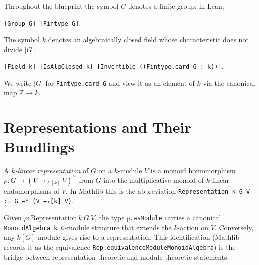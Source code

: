 \begin{definition}
  \label{def:standing-hypotheses}
  \mathlibok
  Throughout the blueprint the symbol $G$ denotes a finite group: in Lean,
  \begin{center}
    \texttt{[Group G] [Fintype G]}.
  \end{center}
  The symbol $k$ denotes an algebraically closed field whose characteristic does
  not divide $|G|$:
  \begin{center}
    \texttt{[Field k] [IsAlgClosed k] [Invertible ((Fintype.card G : k))]}.
  \end{center}
  We write $|G|$ for \texttt{Fintype.card G} and view it as an element of $k$
  via the canonical map $\mathbb Z \to k$.
\end{definition}

\section{Representations and Their Bundlings}

\begin{definition}
  \label{def:representation}
  \mathlibok
  A \emph{$k$-linear representation} of $G$ on a $k$-module $V$ is a monoid
  homomorphism $\rho : G \to (V \to_{\!\ell[k]} V)^{\!\times}$ from $G$ into the
  multiplicative monoid of $k$-linear endomorphisms of $V$. In Mathlib this is
  the abbreviation \texttt{Representation k G V := G →* (V →ₗ[k] V)}.
\end{definition}

\begin{definition}
  \label{def:as-module}
  \mathlibok
  Given $\rho : \mathrm{Representation}\ k\ G\ V$, the type
  \texttt{ρ.asModule} carries a canonical \texttt{MonoidAlgebra k G}-module
  structure that extends the $k$-action on $V$. Conversely, any
  $k[G]$-module gives rise to a representation. This identification (Mathlib
  records it as the equivalence \texttt{Rep.equivalenceModuleMonoidAlgebra}) is
  the bridge between representation-theoretic and module-theoretic statements.
\end{definition}

